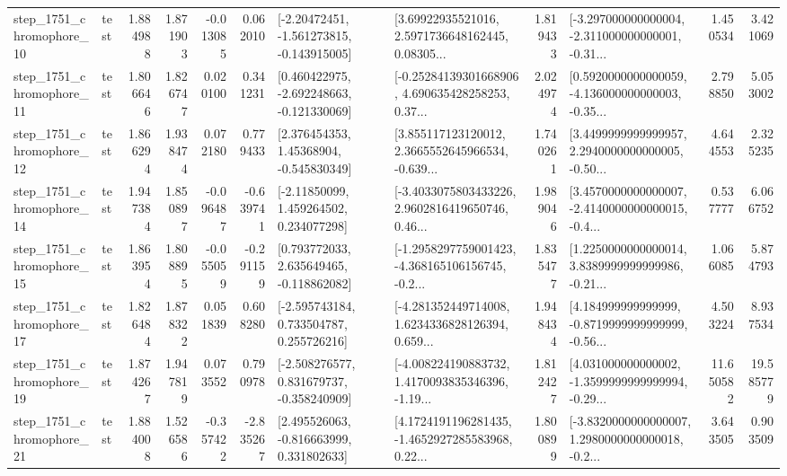 \begin{tabular}{llrrrrllrlrr}
 step\_1751\_chromophore\_10 &      test &      1.884988 &    1.871903 &     -0.013085 &  0.062010 &   [-2.20472451, -1.561273815, -0.143915005] &  [3.69922935521016, 2.5971736648162445, 0.08305... &       1.819433 &  [-3.297000000000004, -2.311000000000001, -0.31... &            1.450534 &          3.421069 \\
 step\_1751\_chromophore\_11 &      test &      1.806646 &    1.826747 &      0.020100 &  0.341231 &   [0.460422975, -2.692248663, -0.121330069] &  [-0.25284139301668906, 4.690635428258253, 0.37... &       2.024974 &  [0.5920000000000059, -4.136000000000003, -0.35... &            2.798850 &          5.053002 \\
 step\_1751\_chromophore\_12 &      test &      1.866294 &    1.938474 &      0.072180 &  0.779433 &     [2.376454353, 1.45368904, -0.545830349] &  [3.855117123120012, 2.3665552645966534, -0.639... &       1.740261 &  [3.4499999999999957, 2.2940000000000005, -0.50... &            4.644553 &          2.325235 \\
 step\_1751\_chromophore\_14 &      test &      1.947384 &    1.850897 &     -0.096487 & -0.639741 &     [-2.11850099, 1.459264502, 0.234077298] &  [-3.4033075803433226, 2.9602816419650746, 0.46... &       1.989046 &  [3.4570000000000007, -2.4140000000000015, -0.4... &            0.537777 &          6.066752 \\
 step\_1751\_chromophore\_15 &      test &      1.863954 &    1.808895 &     -0.055059 & -0.291159 &    [0.793772033, 2.635649465, -0.118862082] &  [-1.2958297759001423, -4.368165106156745, -0.2... &       1.835477 &  [1.2250000000000014, 3.8389999999999986, -0.21... &            1.066085 &          5.874793 \\
 step\_1751\_chromophore\_17 &      test &      1.826484 &    1.878322 &      0.051839 &  0.608280 &    [-2.595743184, 0.733504787, 0.255726216] &  [-4.281352449714008, 1.6234336828126394, 0.659... &       1.948434 &  [4.184999999999999, -0.8719999999999999, -0.56... &            4.503224 &          8.937534 \\
 step\_1751\_chromophore\_19 &      test &      1.874267 &    1.947819 &      0.073552 &  0.790978 &   [-2.508276577, 0.831679737, -0.358240909] &  [-4.008224190883732, 1.4170093835346396, -1.19... &       1.812427 &  [4.031000000000002, -1.3599999999999994, -0.29... &           11.650582 &         19.585779 \\
 step\_1751\_chromophore\_21 &      test &      1.884008 &    1.526586 &     -0.357422 & -2.835267 &    [2.495526063, -0.816663999, 0.331802633] &  [4.1724191196281435, -1.4652927285583968, 0.22... &       1.800899 &  [-3.8320000000000007, 1.2980000000000018, -0.2... &            3.643505 &          0.903509 \\

\end{tabular}
